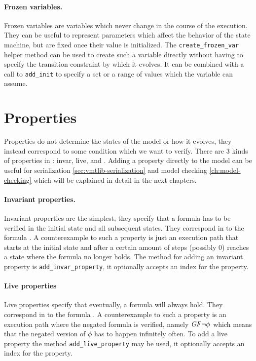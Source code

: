 \paragraph*{Frozen variables.}
Frozen variables are variables which never change in the course of the execution.
They can be useful to represent parameters which affect the behavior of the state machine, but are fixed once their value is initialized.
The \texttt{create\_frozen\_var} helper method can be used to create such a variable directly without having to specify the transition constraint by which it evolves. It can be combined with a call to \texttt{add\_init} to specify a set or a range of values which the variable can assume.

\section{Properties}
Properties do not determine the states of the model or how it evolves, they instead correspond to some condition which we want to verify.
There are 3 kinds of properties in \pyvmt{}: invar, live, and \ltl{}.
Adding a property directly to the model can be useful for serialization \ref{sec:vmtlib-serialization} and model checking \ref{ch:model-checking} which will be explained in detail in the next chapters.

\paragraph*{Invariant properties.}
Invariant properties are the simplest, they specify that a formula has to be verified in the initial state and all subsequent states.
They correspond in \ltl{} to the formula \fsafe{}.
A counterexample to such a property is just an execution path that starts at the initial state and after a certain amount of steps (possibly 0) reaches a state where the formula no longer holds.
The method for adding an invariant property is \texttt{add\_invar\_property}, it optionally accepts an index for the property.

\paragraph*{Live properties}
Live properties specify that eventually, a formula will always hold.
They correspond in \ltl{} to the formula \flive{}.
A counterexample to such a property is an execution path where the negated formula is verified, namely $\mathit{G} \mathit{F} \lnot \phi$ which means that the negated version of $\phi$ has to happen infinitely often.
To add a live property the method \texttt{add\_live\_property} may be used, it optionally accepts an index for the property.

